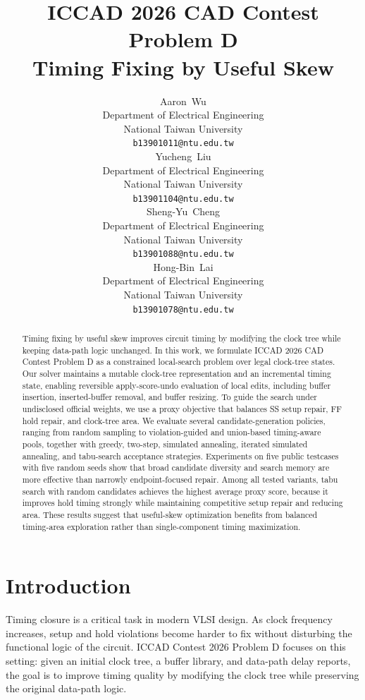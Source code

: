 \documentclass{article}
\title{ \Large{ICCAD 2026 CAD Contest Problem D} \\ \LARGE{Timing Fixing by Useful Skew}}
\author{%
  Aaron~Wu\\
  Department of Electrical Engineering\\
  National Taiwan University\\
  \texttt{b13901011@ntu.edu.tw} \\
  \And
  Yucheng~Liu \\
  Department of Electrical Engineering\\
  National Taiwan University\\
  \texttt{b13901104@ntu.edu.tw} \\
  \And
  Sheng-Yu~Cheng \\
  Department of Electrical Engineering\\
  National Taiwan University\\
  \texttt{b13901088@ntu.edu.tw} \\
  \And
  Hong-Bin~Lai \\
  Department of Electrical Engineering\\
  National Taiwan University\\
  \texttt{b13901078@ntu.edu.tw}
}
\begin{document}
\maketitle

\begin{abstract}
  Timing fixing by useful skew improves circuit timing by modifying the clock tree while keeping data-path logic unchanged. In this work, we formulate ICCAD 2026 CAD Contest Problem D as a constrained local-search problem over legal clock-tree states. Our solver maintains a mutable clock-tree representation and an incremental timing state, enabling reversible apply-score-undo evaluation of local edits, including buffer insertion, inserted-buffer removal, and buffer resizing. To guide the search under undisclosed official weights, we use a proxy objective that balances SS setup repair, FF hold repair, and clock-tree area.
  We evaluate several candidate-generation policies, ranging from random sampling to violation-guided and union-based timing-aware pools, together with greedy, two-step, simulated annealing, iterated simulated annealing, and tabu-search acceptance strategies. Experiments on five public testcases with five random seeds show that broad candidate diversity and search memory are more effective than narrowly endpoint-focused repair. Among all tested variants, tabu search with random candidates achieves the highest average proxy score, because it improves hold timing strongly while maintaining competitive setup repair and reducing area. These results suggest that useful-skew optimization benefits from balanced timing-area exploration rather than single-component timing maximization. \footnotemark
\end{abstract}

\section{Introduction}
Timing closure is a critical task in modern VLSI design. As clock frequency increases, setup and hold violations become harder to fix without disturbing the functional logic of the circuit. ICCAD Contest 2026 Problem D focuses on this setting: given an initial clock tree, a buffer library, and data-path delay reports, the goal is to improve timing quality by modifying the clock tree while preserving the original data-path logic.
\end{document}
